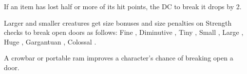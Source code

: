 If an item has lost half or more of its hit points, the DC to break it drops by 2.

Larger and smaller creatures get size bonuses and size penalties on Strength checks to break open doors as follows: Fine , Diminutive , Tiny , Small , Large , Huge , Gargantuan , Colossal .

A crowbar or portable ram improves a character's chance of breaking open a door.
